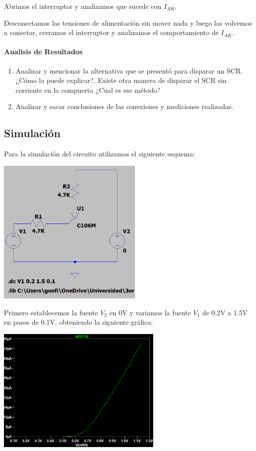 Abrimos el interruptor y analizamos que sucede con $I_{AK}$.

Desconectamos las tensiones de alimentación sin mover nada y luego las volvemos a conectar, cerramos el interruptor y analizamos el comportamiento de $I_{AK}$.


\paragraph{Analisis de Resultados}

\begin{enumerate}
    \item Analizar y mencionar la alternativa que se presentó para disparar un SCR. ¿Cómo la puede explicar?. Existe otra manera de disparar el SCR sin corriente en la compuerta ¿Cual es ese método?
    \item Analizar y sacar conclusiones de las conexiones y mediciones realizadas.
\end{enumerate}


\subsection{Simulación}

Para la simulación del circuito utilizamos el siguiente esquema:

\includegraphics[width=7cm]{./imagenes/Sim1.png}

Primero establecemos la fuente $V_2$ en 0V y variamos la fuente $V_1$ de 0.2V a 1.5V en pasos de 0.1V, obteniendo la siguiente gráfica:

\includegraphics[width=8cm]{./imagenes/Simres1.png}

